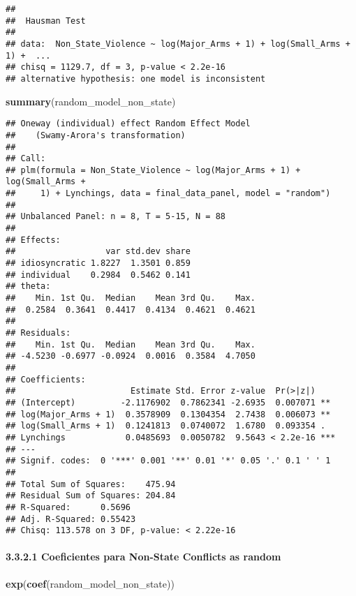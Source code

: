\documentclass[
  11pt,
]{article}
\newenvironment{Shaded}{\begin{snugshade}}{\end{snugshade}}
\newcommand{\FunctionTok}[1]{\textcolor[rgb]{0.13,0.29,0.53}{\textbf{#1}}}
\newcommand{\NormalTok}[1]{#1}
\begin{document}
\begin{verbatim}
## 
##  Hausman Test
## 
## data:  Non_State_Violence ~ log(Major_Arms + 1) + log(Small_Arms + 1) +  ...
## chisq = 1129.7, df = 3, p-value < 2.2e-16
## alternative hypothesis: one model is inconsistent
\end{verbatim}

\begin{Shaded}
\begin{Highlighting}[]
\FunctionTok{summary}\NormalTok{(random\_model\_non\_state)}
\end{Highlighting}
\end{Shaded}

\begin{verbatim}
## Oneway (individual) effect Random Effect Model 
##    (Swamy-Arora's transformation)
## 
## Call:
## plm(formula = Non_State_Violence ~ log(Major_Arms + 1) + log(Small_Arms + 
##     1) + Lynchings, data = final_data_panel, model = "random")
## 
## Unbalanced Panel: n = 8, T = 5-15, N = 88
## 
## Effects:
##                  var std.dev share
## idiosyncratic 1.8227  1.3501 0.859
## individual    0.2984  0.5462 0.141
## theta:
##    Min. 1st Qu.  Median    Mean 3rd Qu.    Max. 
##  0.2584  0.3641  0.4417  0.4134  0.4621  0.4621 
## 
## Residuals:
##    Min. 1st Qu.  Median    Mean 3rd Qu.    Max. 
## -4.5230 -0.6977 -0.0924  0.0016  0.3584  4.7050 
## 
## Coefficients:
##                       Estimate Std. Error z-value  Pr(>|z|)    
## (Intercept)         -2.1176902  0.7862341 -2.6935  0.007071 ** 
## log(Major_Arms + 1)  0.3578909  0.1304354  2.7438  0.006073 ** 
## log(Small_Arms + 1)  0.1241813  0.0740072  1.6780  0.093354 .  
## Lynchings            0.0485693  0.0050782  9.5643 < 2.2e-16 ***
## ---
## Signif. codes:  0 '***' 0.001 '**' 0.01 '*' 0.05 '.' 0.1 ' ' 1
## 
## Total Sum of Squares:    475.94
## Residual Sum of Squares: 204.84
## R-Squared:      0.5696
## Adj. R-Squared: 0.55423
## Chisq: 113.578 on 3 DF, p-value: < 2.22e-16
\end{verbatim}

\paragraph{3.3.2.1 Coeficientes para Non-State Conflicts as
random}\label{coeficientes-para-non-state-conflicts-as-random}

\begin{Shaded}
\begin{Highlighting}[]
\FunctionTok{exp}\NormalTok{(}\FunctionTok{coef}\NormalTok{(random\_model\_non\_state))}
\end{Highlighting}
\end{Shaded}
\end{document}
